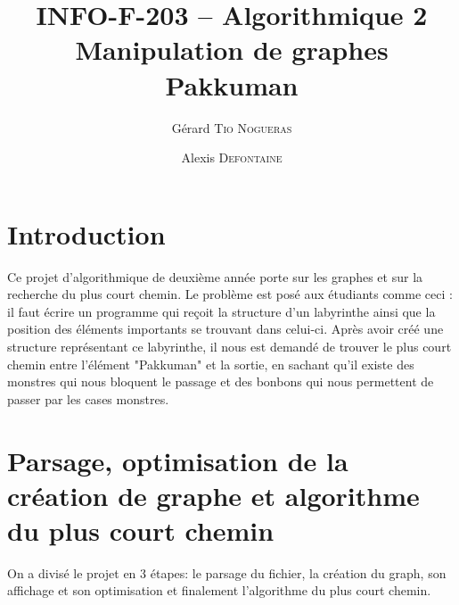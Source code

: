 \documentclass[12pt, oneside]{article}
\title{{\normalsize{INFO-F-203 -- Algorithmique 2}}\\Manipulation de graphes\\ Pakkuman}
\author{Gérard \textsc{Tio Nogueras} \and Alexis \textsc{Defontaine}}
\begin{document}
\maketitle
\section{Introduction}
Ce projet d'algorithmique de deuxième année porte sur les graphes et sur la recherche du plus court chemin.
Le problème est posé aux étudiants comme ceci : il faut écrire un programme qui reçoit la structure d'un labyrinthe ainsi que la position des éléments importants se trouvant dans celui-ci. 
Après avoir créé une structure représentant ce labyrinthe, il nous est demandé de trouver le plus court chemin entre l'élément "Pakkuman" et la sortie, en sachant qu'il existe des monstres qui nous bloquent le passage et des bonbons qui nous permettent de passer par les cases monstres.
\section{Parsage, optimisation de la création de graphe et algorithme du plus court chemin}
On a divisé le projet en 3 étapes: le parsage du fichier, la création du graph, son affichage et son optimisation et finalement l'algorithme du plus court chemin.
\end{document}
